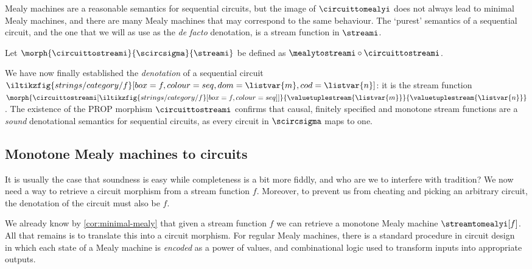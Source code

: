 Mealy machines are a reasonable semantics for sequential circuits, but the
image of \(\circuittomealyi\) does not always lead to minimal Mealy machines,
and there are many Mealy machines that may correspond to the same behaviour.
The `purest' semantics of a sequential circuit, and the one that we will as use
as the \emph{de facto} denotation, is a stream function in \(\streami\).

\begin{definition}
    Let \(\morph{\circuittostreami}{\scircsigma}{\streami}\) be defined as
    \(\mealytostreami \circ \circuittostreami\).
\end{definition}

We have now finally established the \emph{denotation} of a sequential circuit \(
\iltikzfig{strings/category/f}[box=f,colour=seq,dom=\listvar{m},cod=\listvar{n}]
\): it is the stream function \(
\morph{\circuittostreami[\iltikzfig{strings/category/f}[box=f,colour=seq]]}{\valuetuplestream{\listvar{m}}}{\valuetuplestream{\listvar{n}}}
\).
The existence of the PROP morphism \(\circuittostreami\) confirms that causal,
finitely specified and monotone stream functions are a \emph{sound} denotational
semantics for sequential circuits, as every circuit in \(\scircsigma\)
maps to one.

\subsection{Monotone Mealy machines to circuits}

It is usually the case that soundness is easy while completeness is a bit more
fiddly, and who are we to interfere with tradition?
We now need a way to retrieve a circuit morphism from a stream
function \(f\).
Moreover, to prevent us from cheating and picking an arbitrary circuit, the
denotation of the circuit must also be \(f\).

We already know by \cref{cor:minimal-mealy} that given a stream function
\(f\) we can retrieve a monotone Mealy machine \(\streamtomealyi[f]\).
All that remains is to translate this into a circuit morphism.
For regular Mealy machines, there is a standard procedure in circuit
design~\cite{kohavi2009switching} in which each state of a Mealy machine is
\emph{encoded} as a power of values, and combinational logic used to transform
inputs into appropriate outputs.

\begin{example}
\end{example}

